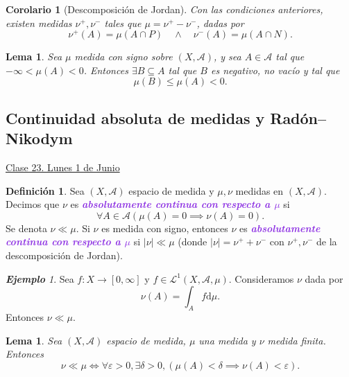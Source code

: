 \documentclass{article}
\newtheorem{corollary}[theorem]{Corolario}
\newtheorem{lemma}[theorem]{Lema}
\theoremstyle{definition}
\newtheorem{definition}[theorem]{Definición}
\theoremstyle{remark}
\newtheorem{example}[theorem]{\textbf{Ejemplo}}
\numberwithin{equation}{section}
\newcommand{\A}{\mathcal{A}}
\newcommand{\Acal}{\mathcal{A}}
\newcommand{\Lcal}{\mathcal{L}}
\renewcommand{\d}{\mathrm{d}}
\newcommand{\e}{\varepsilon}
\newcommand{\oo}{\infty}
\newcommand{\abs}[1]{\left| #1 \right|}
\newcommand{\wea}[1]{\textcolor{BlueViolet}{\textbf{\emph{#1}}}}
\newcommand{\fecha}[1]{\begin{flushright} \underline{#1} \end{flushright}}
\begin{document}
\begin{corollary}
  [Descomposición de Jordan]
  Con las condiciones anteriores, existen medidas $\nu^+,\nu^-$ tales que $\mu = \nu^+ - \nu^-$, dadas por
  \[ \nu^+(A) = \mu(A \cap P) \quad\land\quad \nu^-(A) = \mu(A \cap N). \]
\end{corollary}

\begin{lemma}
  Sea $\mu$ medida con signo sobre $(X,\A)$, y sea $A \in \A$ tal que $-\oo < \mu(A) < 0$. Entonces $\exists B \subseteq A$ tal que $B$ es negativo, no vacío y tal que
  \[ \mu(B) \leq \mu(A) < 0. \]
\end{lemma}

\newpage
\subsection{Continuidad absoluta de medidas y Radón--Nikodym}
\fecha{Clase 23. Lunes 1 de Junio}

\begin{definition}
  Sea $(X,\Acal)$ espacio de medida y $\mu,\nu$ medidas en $(X,\Acal)$. Decimos que $\nu$ es \wea{absolutamente continua con respecto a $\mu$} si
  \[ \forall A \in \Acal (\mu(A) = 0 \implies \nu(A) = 0). \]
  Se denota $\nu \ll\mu$. Si $\nu$ es medida con signo, entonces $\nu$ es \wea{absolutamente continua con respecto a $\mu$} si $\abs\nu \ll \mu$ (donde $\abs\nu = \nu^+ + \nu^-$ con $\nu^+,\nu^-$ de la descomposición de Jordan).
\end{definition}

\begin{example}
  Sea $f \colon X \to [0,\oo]$ y $f \in \Lcal^1(X,\Acal, \mu)$. Consideramos $\nu$ dada por
  \[ \nu(A) = \int_A f \d\mu. \]
  Entonces $\nu \ll \mu$.
\end{example}

\begin{lemma}
  Sea $(X,\Acal)$ espacio de medida, $\mu$ una medida y $\nu$ medida finita. Entonces
  \[ \nu \ll \mu \iff \forall \e>0, \exists \delta>0, (\mu(A) < \delta \implies \nu(A) < \e). \]
\end{lemma}
\end{document}
